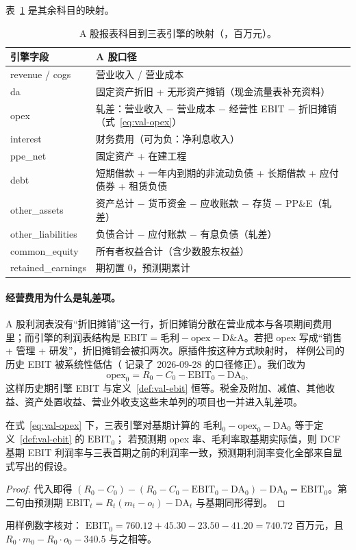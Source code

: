 表~\ref{tab:val-map} 是其余科目的映射。

\begin{table}[t]
\centering
\caption{A 股报表科目到三表引擎的映射（，百万元）。}
\label{tab:val-map}
\small
\begin{tabularx}{\linewidth}{@{}l X@{}}
\toprule
引擎字段 & A 股口径 \\
\midrule
revenue / cogs & 营业收入 / 营业成本 \\
da & 固定资产折旧 + 无形资产摊销（现金流量表补充资料） \\
opex & 轧差：营业收入 − 营业成本 − 经营性 EBIT − 折旧摊销（式~\ref{eq:val-opex}） \\
interest & 财务费用（可为负：净利息收入） \\
ppe\_net & 固定资产 + 在建工程 \\
debt & 短期借款 + 一年内到期的非流动负债 + 长期借款 + 应付债券 + 租赁负债 \\
other\_assets & 资产总计 − 货币资金 − 应收账款 − 存货 − PP\&E（轧差） \\
other\_liabilities & 负债合计 − 应付账款 − 有息负债（轧差） \\
common\_equity & 所有者权益合计（含少数股东权益） \\
retained\_earnings & 期初置 0，预测期累计 \\
\bottomrule
\end{tabularx}
\end{table}

\paragraph{经营费用为什么是轧差项。} A 股利润表没有“折旧摊销”这一行，折旧摊销分散在营业成本与各项期间费用里；而引擎的利润表结构是
$\text{EBIT}=\text{毛利}-\text{opex}-\text{D\&A}$。若把 opex 写成“销售 + 管理 + 研发”，折旧摊销会被扣两次。原插件按这种方式映射时，
样例公司的历史 EBIT 被系统性低估（ 记录了 2026-09-28 的口径修正）。我们改为
\begin{equation}
\text{opex}_0=R_0-C_0-\text{EBIT}_0-\text{DA}_0,
\label{eq:val-opex}
\end{equation}
这样历史期引擎 EBIT 与定义~\ref{def:val-ebit} 恒等。税金及附加、减值、其他收益、资产处置收益、营业外收支这些未单列的项目也一并进入轧差项。

\begin{proposition}
\label{prop:val-ebit}
在式~\eqref{eq:val-opex} 下，三表引擎对基期计算的 $\text{毛利}_0-\text{opex}_0-\text{DA}_0$ 等于定义~\ref{def:val-ebit} 的 $\text{EBIT}_0$；
若预测期 opex 率、毛利率取基期实际值，则 DCF 基期 EBIT 利润率与三表首期之前的利润率一致，预测期利润率变化全部来自显式写出的假设。
\end{proposition}
\begin{proof}
代入即得 $(R_0-C_0)-(R_0-C_0-\text{EBIT}_0-\text{DA}_0)-\text{DA}_0=\text{EBIT}_0$。第二句由预测期 $\text{EBIT}_t=R_t(m_t-o_t)-\text{DA}_t$ 与基期同形得到。
\end{proof}
 用样例数字核对：
$\text{EBIT}_0=760.12+45.30-23.50-41.20=740.72$ 百万元，且 $R_0\cdot m_0-R_0\cdot o_0-340.5$ 与之相等。

